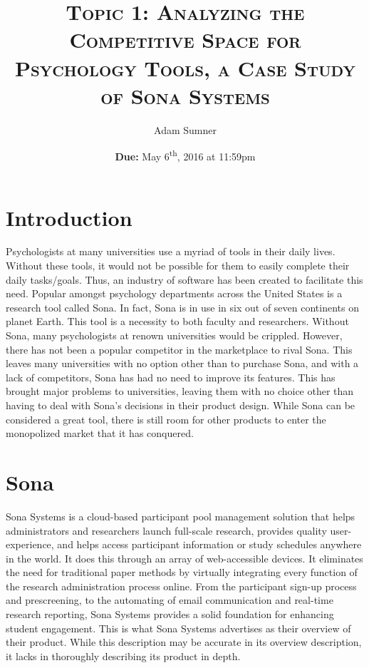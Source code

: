 \documentclass[12pt]{article}
\title{\LARGE\textsc{Topic 1: Analyzing the Competitive Space for Psychology Tools, a Case Study of Sona Systems}}
\author{Adam Sumner}
\date{\textbf{Due: }May 6\textsuperscript{th}, 2016 at 11:59pm}
\begin{document}
\maketitle
\section{Introduction}
Psychologists at many universities use a myriad of tools in their daily lives. Without these tools, it would not be possible for them to easily complete their daily tasks/goals. Thus, an industry of software has been created to facilitate this need. Popular amongst psychology departments across the United States is a research tool called Sona. In fact, Sona is in use in six out of seven continents on planet Earth. This tool is a necessity to both faculty and researchers. Without Sona, many psychologists at renown universities would be crippled. However, there has not been a popular competitor in the marketplace to rival Sona. This leaves many universities with no option other than to purchase Sona, and with a lack of competitors, Sona has had no need to improve its features. This has brought major problems to universities, leaving them with no choice other than having to deal with Sona's decisions in their product design. While Sona can be considered a great tool, there is still room for other products to enter the monopolized market that it has conquered. 

\section{Sona}
Sona Systems is a cloud-based participant pool management solution that helps administrators and researchers launch full-scale research, provides quality user-experience, and helps access participant information or study schedules anywhere in the world. It does this through an array of web-accessible devices. It eliminates the need for traditional paper methods by virtually integrating every function of the research administration process online. From the participant sign-up process and prescreening, to the automating of email communication and real-time research reporting, Sona Systems provides a solid foundation for enhancing student engagement\cite{sona}. This is what Sona Systems advertises as their overview of their product. While this description may be accurate in its overview description, it lacks in thoroughly describing its product in depth.
\end{document}
